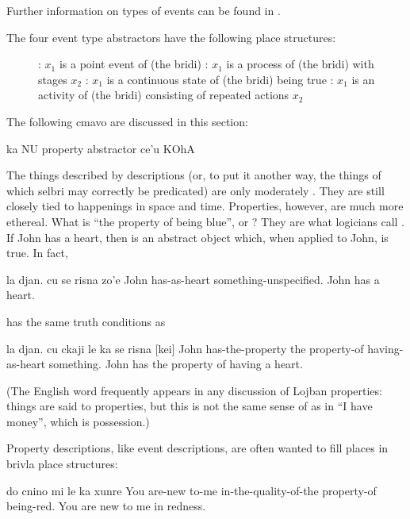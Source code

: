 Further information on types of events can be found in .

The four event type abstractors have the following place
    structures:
\begin{description}
\item[] : $x_1$ is a point event of (the bridi) : $x_1$ is a process of (the bridi) with stages $x_2$ : $x_1$ is a continuous state of (the bridi) being true : $x_1$ is an activity of (the bridi) consisting of repeated actions $x_2$
\end{description}



The following cmavo are discussed in this section:

   ka  NU  property abstractor
    ce'u    KOhA    

The things described by  descriptions (or, to put
    it another way, the things of which  selbri may correctly
    be predicated) are only moderately . They are still
    closely tied to happenings in space and time. Properties,
    however, are much more ethereal. What is ``the property of
    being blue'', or ? They are
    what logicians call . If John has a heart, then
     is an abstract object which,
    when applied to John, is true. In fact,
\begin{example}
la djan. cu se risna zo'e\n
John has-as-heart something-unspecified.\n
John has a heart.
\end{example}

{\noindent}has the same truth conditions as
\begin{example}
la djan. cu ckaji\n
\T	le ka se risna  [kei]\n
John has-the-property\n
\T	the property-of having-as-heart something.\n
John has the property of having a heart.
\end{example}

(The English word  frequently appears in any discussion
    of Lojban properties: things are said to  properties,
    but this is not the same sense of  as in ``I have
    money'', which is possession.) 

Property descriptions, like event descriptions, are often
    wanted to fill places in brivla place structures:
\begin{example}
do cnino mi\n
\T	le ka xunre \n
You are-new to-me\n
\T	in-the-quality-of-the property-of being-red.\n
You are new to me in redness.
\end{example}

